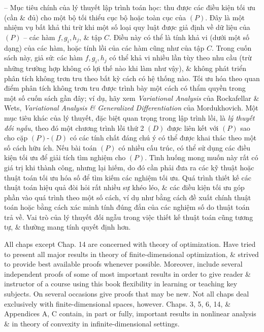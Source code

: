 \documentclass{article}
\begin{document}
\begin{itemize}
    -- Mục tiêu chính của lý thuyết lập trình toán học: thu được các điều kiện tối ưu (cần \& đủ) cho một bộ tối thiểu cục bộ hoặc toàn cục của $(P)$. Đây là một nhiệm vụ bất khả thi trừ khi một số loại quy luật được giả định về dữ liệu của $(P)$ -- các hàm $f,g_i,h_j$, \& tập $C$. Điều này có thể là tính khả vi (dưới một số dạng) của các hàm, hoặc tính lồi của các hàm cũng như của tập $C$. Trong cuốn sách này, giả sử: các hàm $f,g_i,h_j$ có thể khả vi nhiều lần tùy theo nhu cầu (trừ những trường hợp không có lợi thế nào khi làm như vậy), \& không phát triển phân tích không trơn tru theo bất kỳ cách có hệ thống nào. Tối ưu hóa theo quan điểm phân tích không trơn tru được trình bày một cách có thẩm quyền trong một số cuốn sách gần đây; ví dụ, hãy xem {\it Variational Analysis} của {\sc Rockafellar \& Wets}, {\it Variational Analysis \& Generalized Differentiation} của {\sc Mordukhovich}. Một mục tiêu khác của lý thuyết, đặc biệt quan trọng trong lập trình lồi, là {\it lý thuyết đối ngẫu}, theo đó một chương trình lồi thứ 2 $(D)$ được liên kết với $(P)$ sao cho cặp $(P)$-$(D)$ có các tính chất đáng chú ý có thể được khai thác theo một số cách hữu ích. Nếu bài toán $(P)$ có nhiều cấu trúc, có thể sử dụng các điều kiện tối ưu để giải tích tìm nghiệm cho $(P)$. Tình huống mong muốn này rất có giá trị khi thành công, nhưng lại hiếm, do đó cần phải đưa ra các kỹ thuật hoặc thuật toán tối ưu hóa số để tìm kiếm các nghiệm tối ưu. Quá trình thiết kế các thuật toán hiệu quả đòi hỏi rất nhiều sự khéo léo, \& các điều kiện tối ưu góp phần vào quá trình theo một số cách, ví dụ như bằng cách đề xuất chính thuật toán hoặc bằng cách xác minh tính đúng đắn của các nghiệm số do thuật toán trả về. Vai trò của lý thuyết đối ngẫu trong việc thiết kế thuật toán cũng tương tự, \& thường mang tính quyết định hơn.

    All chaps except Chap. 14 are concerned with theory of optimization. Have tried to present all major results in theory of finite-dimensional optimization, \& strived to provide best available proofs whenever possible. Moreover, include several independent proofs of some of most important results in order to give reader \& instructor of a course using this book flexibility in learning or teaching key subjects. On several occasions give proofs that may be new. Not all chaps deal exclusively with finite-dimensional spaces, however. Chaps. 3, 5, 6, 14, \& Appendices A, C contain, in part or fully, important results in nonlinear analysis \& in theory of convexity in infinite-dimensional settings.


\end{itemize}
\end{document}
